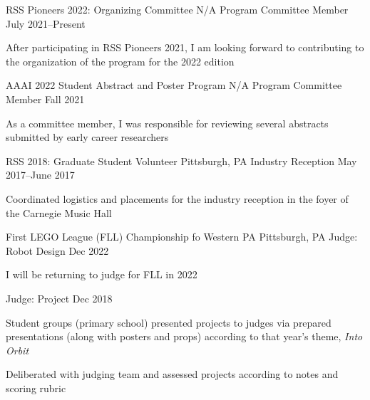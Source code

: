 
\begin{cventries}
  \cventry
  {RSS Pioneers 2022: Organizing Committee}
  {N/A}
  {Program Committee Member}
  {July 2021--Present}
  {
    \begin{cvitems}
    \item After participating in RSS Pioneers 2021, I am looking forward to
      contributing to the organization of the program for the 2022 edition
    \end{cvitems}
  }
  \cventry
  {AAAI 2022 Student Abstract and Poster Program}
  {N/A}
  {Program Committee Member}
  {Fall 2021}
  {
    \begin{cvitems}
    \item As a committee member, I was responsible for reviewing several
      abstracts submitted by early career researchers
    \end{cvitems}
  }
  \cventry
  {RSS 2018: Graduate Student Volunteer}
  {Pittsburgh, PA}
  {Industry Reception}
  {May 2017--June 2017}
  {
    \begin{cvitems}
    \item Coordinated logistics and placements for the industry reception
      in the foyer of the Carnegie Music Hall
    \end{cvitems}
  }
  \cventrytwo
  {First LEGO League (FLL) Championship fo Western PA}
  {Pittsburgh, PA}
  {Judge: Robot Design}
  {Dec 2022}
  {
    \begin{cvitems}
    \item I will be returning to judge for FLL in 2022
    \end{cvitems}
  }
  {Judge: Project}
  {
    Dec 2018
  }
  {
    \begin{cvitems}
    \item Student groups (primary school) presented projects to judges via
      prepared presentations (along with posters and props) according to that
      year's theme, \emph{Into Orbit}
    \item Deliberated with judging team and assessed projects according to
      notes and scoring rubric
    \end{cvitems}
  }
\end{cventries}
